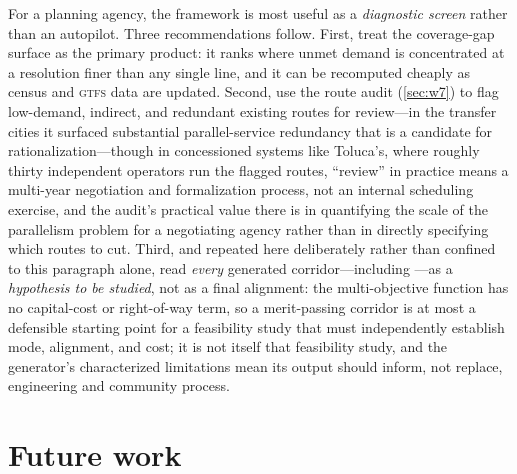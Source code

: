 For a planning agency, the framework is most useful as a \emph{diagnostic screen} rather
than an autopilot. Three recommendations follow. First, treat the coverage-gap surface
as the primary product: it ranks where unmet demand is concentrated at a resolution finer
than any single line, and it can be recomputed cheaply as census and \textsc{gtfs} data
are updated. Second, use the route audit (\cref{sec:w7}) to flag low-demand, indirect,
and redundant existing routes for review---in the transfer cities it surfaced substantial
parallel-service redundancy that is a candidate for rationalization---though in
concessioned systems like Toluca's, where roughly thirty independent operators run the
flagged routes, ``review'' in practice means a multi-year negotiation and
formalization process, not an internal scheduling exercise, and the audit's practical
value there is in quantifying the scale of the parallelism problem for a negotiating
agency rather than in directly specifying which routes to cut. Third, and repeated
here deliberately rather than confined to this paragraph alone, read \emph{every}
generated corridor---including ---as a \emph{hypothesis to be studied},
not as a final alignment: the multi-objective function has no capital-cost or
right-of-way term, so a merit-passing corridor is at most a defensible starting point
for a feasibility study that must independently establish mode, alignment, and cost;
it is not itself that feasibility study, and the generator's characterized
limitations mean its output should inform, not replace, engineering and community
process.

\section{Future work}
\label{sec:concl-future}

